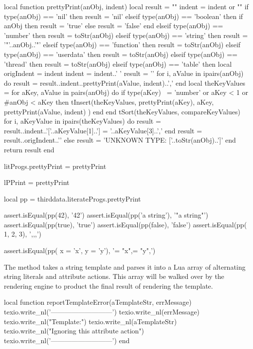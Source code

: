 local function prettyPrint(anObj, indent)
  local result = ""
  indent = indent or ""
  if type(anObj) == 'nil' then
    result = 'nil'
  elseif type(anObj) == 'boolean' then
    if anObj then result = 'true' else result = 'false' end
  elseif type(anObj) == 'number' then
    result = toStr(anObj)
  elseif type(anObj) == 'string' then
    result = '"'..anObj..'"'
  elseif type(anObj) == 'function' then
    result = toStr(anObj)
  elseif type(anObj) == 'userdata' then
    result = toStr(anObj)
  elseif type(anObj) == 'thread' then
    result = toStr(anObj)
  elseif type(anObj) == 'table' then
    local origIndent = indent
    indent = indent..'  '
    result = '{\n'
    for i, aValue in ipairs(anObj) do
      result = result..indent..prettyPrint(aValue, indent)..',\n'
    end
    local theKeyValues = { }
    for aKey, aValue in pairs(anObj) do
      if type(aKey) ~= 'number' or aKey < 1 or #anObj < aKey then
        tInsert(theKeyValues,
          { prettyPrint(aKey), aKey, prettyPrint(aValue, indent) })
      end
    end
    tSort(theKeyValues, compareKeyValues)
    for i, aKeyValue in ipairs(theKeyValues) do
      result = result..indent..'['..aKeyValue[1]..'] = '..aKeyValue[3]..',\n'
    end
    result = result..origIndent..'}'
  else
    result = 'UNKNOWN TYPE: ['..toStr(anObj)..']'
  end
  return result
end

litProgs.prettyPrint = prettyPrint

lPPrint = prettyPrint
\stopLuaCode


\startLuaTest
local pp = thirddata.literateProgs.prettyPrint

assert.isEqual(pp(42),         '42')
assert.isEqual(pp('a string'), '"a string"')
assert.isEqual(pp(true),       'true')
assert.isEqual(pp(false),      'false')
assert.isEqual(pp({ 1, 2, 3}), '{,,,\n}')

assert.isEqual(pp({ x = 'x', y = 'y'}),
  '{\n  ["x"] = "x",\n  ["y"] = "y",\n}')
\stopLuaTest
\stopTestCase
\stopTestSuite

\startTestSuite[parseTemplate]

The  method takes a string template and parses it into 
a Lua array of alternating string literals and attribute actions. This 
array will be walked over by the  rendering engine to 
product the final result of rendering the template. 

\startLuaCode
local function reportTemplateError(aTemplateStr, errMessage)
  texio.write_nl('---------------------------')
  texio.write_nl(errMessage)
  texio.write_nl("Template:")
  texio.write_nl(aTemplateStr)
  texio.write_nl("Ignoring this attribute action")
  texio.write_nl('---------------------------')
end

